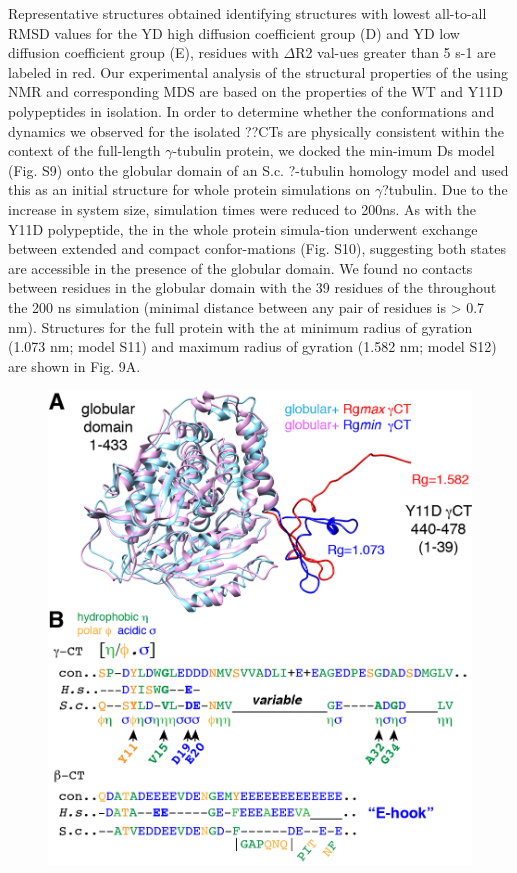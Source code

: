 Representative structures obtained identifying structures with lowest all-to-all RMSD values for the YD high diffusion coefficient group (D) and YD low diffusion coefficient group (E), residues with $\Delta$R2 val-ues greater than 5 s-1 are labeled in red.
	Our experimental analysis of the structural properties of the \gct{} using NMR and corresponding MDS are based on the properties of the WT and Y11D \gct{} polypeptides in isolation. In order to determine whether the conformations and dynamics we observed for the isolated ??CTs are physically consistent within the context of the full-length $\gamma$-tubulin protein, we docked the min-imum Ds \gct{} model (Fig. S9) onto the globular domain of an S.c. ?-tubulin homology model and used this as an initial structure for whole protein simulations on $\gamma$?tubulin. Due to the increase in system size, simulation times were reduced to 200ns.  As with the Y11D \gct{} polypeptide, the \gct{} in the whole protein simula-tion underwent exchange between extended and compact confor-mations (Fig. S10), suggesting both states are accessible in the presence of the globular domain. We found no contacts between residues in the globular domain with the 39 residues of the \gct{} throughout the 200 ns simulation (minimal distance between any pair of residues is > 0.7 nm). Structures for the full protein with the \gct{} at minimum radius of gyration (1.073 nm; model S11) and maximum radius of gyration (1.582 nm; model S12) are shown in Fig. 9A.

\begin{figure}
\includegraphics{figures/Figure_9.png}
\end{figure}

